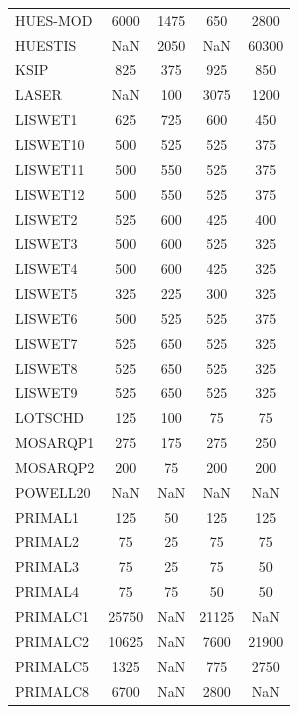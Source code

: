 \begin{longtable}{lcccc}
HUES-MOD &     6000 &  1475 &      650 &     2800 \\
HUESTIS  &      NaN &  2050 &      NaN &    60300 \\
KSIP     &      825 &   375 &      925 &      850 \\
LASER    &      NaN &   100 &     3075 &     1200 \\
LISWET1  &      625 &   725 &      600 &      450 \\
LISWET10 &      500 &   525 &      525 &      375 \\
LISWET11 &      500 &   550 &      525 &      375 \\
LISWET12 &      500 &   550 &      525 &      375 \\
LISWET2  &      525 &   600 &      425 &      400 \\
LISWET3  &      500 &   600 &      525 &      325 \\
LISWET4  &      500 &   600 &      425 &      325 \\
LISWET5  &      325 &   225 &      300 &      325 \\
LISWET6  &      500 &   525 &      525 &      375 \\
LISWET7  &      525 &   650 &      525 &      325 \\
LISWET8  &      525 &   650 &      525 &      325 \\
LISWET9  &      525 &   650 &      525 &      325 \\
LOTSCHD  &      125 &   100 &       75 &       75 \\
MOSARQP1 &      275 &   175 &      275 &      250 \\
MOSARQP2 &      200 &    75 &      200 &      200 \\
POWELL20 &      NaN &   NaN &      NaN &      NaN \\
PRIMAL1  &      125 &    50 &      125 &      125 \\
PRIMAL2  &       75 &    25 &       75 &       75 \\
PRIMAL3  &       75 &    25 &       75 &       50 \\
PRIMAL4  &       75 &    75 &       50 &       50 \\
PRIMALC1 &    25750 &   NaN &    21125 &      NaN \\
PRIMALC2 &    10625 &   NaN &     7600 &    21900 \\
PRIMALC5 &     1325 &   NaN &      775 &     2750 \\
PRIMALC8 &     6700 &   NaN &     2800 &      NaN \\

\end{longtable}

